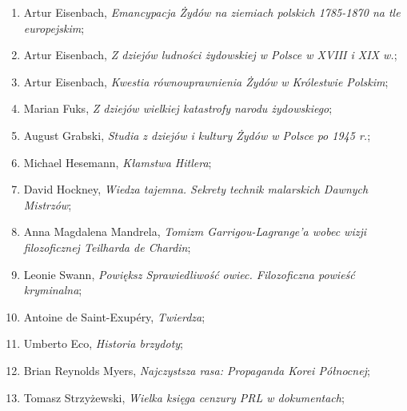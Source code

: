 \documentclass[a4paper,11pt]{article}
\begin{document}
\begin{enumerate}
\item Artur Eisenbach, \textit{Emancypacja Żydów na ziemiach polskich
    1785-1870 na tle europejskim};



\item Artur Eisenbach, \textit{Z dziejów ludności żydowskiej w Polsce w
    XVIII i XIX w.};



\item Artur Eisenbach, \textit{Kwestia równouprawnienia Żydów w
    Królestwie Polskim};



\item Marian Fuks, \textit{Z dziejów wielkiej katastrofy narodu
    żydowskiego};



\item August Grabski, \textit{Studia z dziejów i kultury Żydów w Polsce
    po 1945 r.};



\item Michael Hesemann, \textit{Kłamstwa Hitlera};



\item David Hockney, \textit{Wiedza tajemna. Sekrety technik malarskich
    Dawnych Mistrzów};



\item Anna Magdalena Mandrela, \textit{Tomizm Garrigou-Lagrange’a wobec
    wizji filozoficznej Teilharda de Chardin};



\item Leonie Swann, \textit{Powiększ Sprawiedliwość owiec. Filozoficzna
    powieść kryminalna};



\item Antoine de Saint-Exupéry, \textit{Twierdza};



\item Umberto Eco, \textit{Historia brzydoty};



\item Brian Reynolds Myers, \textit{Najczystsza rasa: Propaganda Korei
    Północnej};



\item Tomasz Strzyżewski, \textit{Wielka księga cenzury PRL w
    dokumentach};




\end{enumerate}
\end{document}
